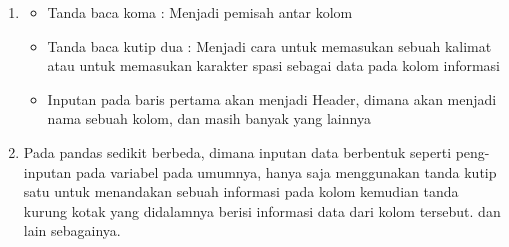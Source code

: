 \begin{enumerate}
			\item 
				\begin {itemize} 
					\item Tanda baca koma : Menjadi pemisah antar kolom
					\item Tanda baca kutip dua : Menjadi cara untuk memasukan sebuah kalimat atau untuk memasukan karakter spasi sebagai data pada kolom informasi
					\item Inputan pada baris pertama akan menjadi Header, dimana akan menjadi nama sebuah kolom, dan masih banyak yang lainnya
				\end{itemize}
			
			\item Pada pandas sedikit berbeda, dimana inputan data berbentuk seperti peng-inputan pada variabel pada umumnya, hanya saja menggunakan tanda kutip satu untuk menandakan sebuah informasi pada kolom kemudian tanda kurung kotak yang didalamnya berisi informasi data dari kolom tersebut. dan lain sebagainya.
			
		\end{enumerate}
